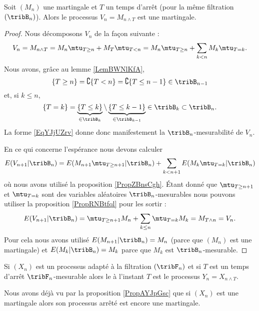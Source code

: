 \begin{proposition} \label{PropAYJpGsc}
    Soit \( (M_n)\) une martingale et \( T\) un temps d'arrêt (pour la même filtration \( (\tribB_n)\)). Alors le processus \( V_n=M_{n\wedge T}\) est une martingale.
\end{proposition}

\begin{proof}
    Nous décomposons \( V_n\) de la façon suivante :
    \begin{equation}    \label{EqYJjUZrv}
        V_n=M_{n\wedge T}=M_n\mtu_{T\geq n}+M_T\mtu_{T<n}=M_n\mtu_{T\geq n}+\sum_{k< n}M_k\mtu_{T=k}.
    \end{equation}
    Nous avons, grâce au lemme \ref{LemBWNlKfA},
    \begin{equation}
        \{ T\geq n \}=\complement\{ T<n \}=\complement\{ T\leq n-1 \}\in\tribB_{n-1}
    \end{equation}
    et, si \( k\leq n\),
    \begin{equation}
        \{ T=k \}=\underbrace{\{ T\leq k \}}_{\in\tribB_k}\setminus\underbrace{\{ T\leq k-1 \}}_{\in\tribB_{k-1}}\in\tribB_k\subset\tribB_n.
    \end{equation}
    La forme \eqref{EqYJjUZrv} donne donc manifestement la \( \tribB_n\)-mesurabilité de \( V_n\).

    En ce qui concerne l'espérance nous devons calculer
    \begin{equation}
        E(V_{n+1}|\tribB_n)=E(M_{n+1}\mtu_{T\geq n+1}|\tribB_n)+\sum_{k<n+1}E(M_k\mtu_{T=k}|\tribB_n)
    \end{equation}
    où nous avons utilisé la proposition \ref{PropZBnsCgh}. Étant donné que \( \mtu_{T\geq n+1}\) et \( \mtu_{T=k}\) sont des variables aléatoires \( \tribB_n\)-mesurables nous pouvons utiliser la proposition \ref{PropRNBtfql} pour les sortir :
    \begin{equation}
        E(V_{n+1}|\tribB_n)=\mtu_{T\geq n+1}M_n+\sum_{k\leq n}\mtu_{T=k}M_k=M_{T\wedge n}=V_n.
    \end{equation}
    Pour cela nous avons utilisé \( E(M_{n+1}|\tribB_n)=M_n\) (parce que \( (M_n)\) est une martingale) et \( E(M_k|\tribB_n)=M_k\) parce que \( M_k\) est \( \tribB_n\)-mesurable.
\end{proof}

\begin{definition}
    Si \( (X_n)\) est un processus adapté à la filtration \( (\tribF_n)\) et si \( T\) est un temps d'arrêt \( \tribF_n\)-mesurable alors le  à l'instant \( T\) est le processus \( Y_n=X_{n\wedge T}\).
\end{definition}
Nous avons déjà vu par la proposition \ref{PropAYJpGsc} que si \( (X_n)\) est une martingale alors son processus arrêté est encore une martingale.


